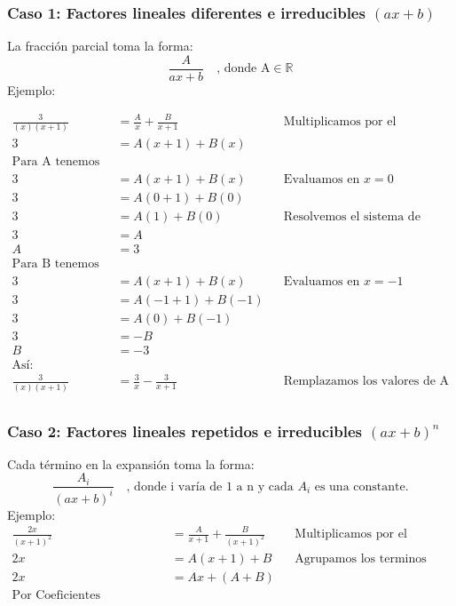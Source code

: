 \documentclass{templateNote}
\begin{document}
\newpage
\subsubsection{Caso 1: Factores lineales diferentes e irreducibles $(ax + b)$}
\indent
La fracción parcial toma la forma:
\[
    \frac{A}{ax +b} \quad \text{, donde A} \in \mathbb{R}
\]
Ejemplo:

\begin{align*}
    \frac{3}{(x)(x+1)} &= \frac{A}{x} + \frac{B}{x+1} && \text{Multiplicamos por el denominador} \\
    3 &= A(x+1) + B(x) \\
    \text{Para A tenemos que:} \\
    3 &= A(x+1) + B(x) && \text{Evaluamos en $x=0$} \\
    3 &= A(0+1) + B(0) \\
    3 &= A(1) + B(0) && \text{Resolvemos el sistema de ecuaciones} \\
    3 &= A \\
    A &= 3 \\
    \text{Para B tenemos que:} \\
    3 &= A(x+1) + B(x) && \text{Evaluamos en $x=-1$} \\
    3 &= A(-1+1) + B(-1) \\
    3 &= A(0) + B(-1) \\
    3 &= -B \\
    B &= -3 \\
    \text{Así:} \\
    \frac{3}{(x)(x+1)} &= \frac{3}{x} - \frac{3}{x+1} && \text{Remplazamos los valores de A y B} \\
\end{align*}

\newpage
\subsubsection{Caso 2: Factores lineales repetidos e irreducibles $(ax + b)^n$}
\indent
Cada término en la expansión toma la forma:
\[
    \frac{A_i}{(ax + b)^i} \quad \text{, donde i varía de 1 a n y cada } A_i \text{ es una constante.}
\]
Ejemplo:
\begin{align*}
    \frac{2x}{(x+1)^2} &= \frac{A}{x+1} + \frac{B}{(x+1)^2} && \text{Multiplicamos por el denominador} \\
    2x &= A(x+1) + B && \text{Agrupamos los terminos segun su grado}\\
    2x &= Ax + (A + B) \\
    \text{Por Coeficientes Equivalentes tenemos:}
\end{align*}
\end{document}
